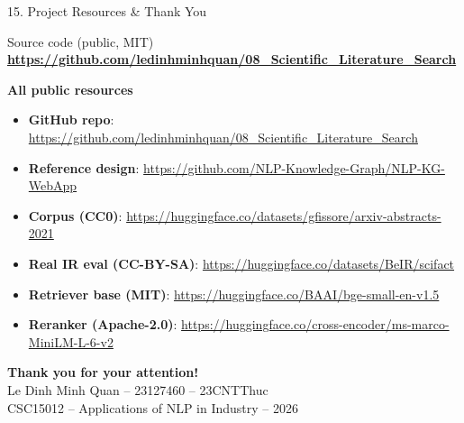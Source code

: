 \documentclass[10pt,aspectratio=169]{beamer}
\begin{document}
\begin{frame}{15. Project Resources \& Thank You}
\begin{block}{Source code (public, MIT)}
\centering
\large \textbf{\url{https://github.com/ledinhminhquan/08_Scientific_Literature_Search}}
\end{block}

\textbf{All public resources}
\begin{itemize}\scriptsize
  \item \textbf{GitHub repo}: \tiny\url{https://github.com/ledinhminhquan/08_Scientific_Literature_Search}
  \item \textbf{Reference design}: \tiny\url{https://github.com/NLP-Knowledge-Graph/NLP-KG-WebApp}
  \item \textbf{Corpus (CC0)}: \tiny\url{https://huggingface.co/datasets/gfissore/arxiv-abstracts-2021}
  \item \textbf{Real IR eval (CC-BY-SA)}: \tiny\url{https://huggingface.co/datasets/BeIR/scifact}
  \item \textbf{Retriever base (MIT)}: \tiny\url{https://huggingface.co/BAAI/bge-small-en-v1.5}
  \item \textbf{Reranker (Apache-2.0)}: \tiny\url{https://huggingface.co/cross-encoder/ms-marco-MiniLM-L-6-v2}
\end{itemize}

\vspace{0.25cm}
\centering
\Large\textbf{Thank you for your attention!}\\[0.2cm]
\normalsize Le Dinh Minh Quan -- 23127460 -- 23CNTThuc \\
\small CSC15012 -- Applications of NLP in Industry -- 2026
\end{frame}
\end{document}
